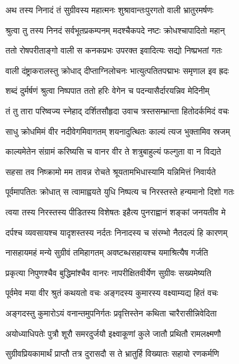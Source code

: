 
\twolineshloka
{अथ तस्य निनादं तं सुग्रीवस्य महात्मनः}
{शुश्रावान्तःपुरगतो वाली भ्रातुरमर्षणः} %

\twolineshloka
{श्रुत्वा तु तस्य निनदं सर्वभूतप्रकम्पनम्}
{मदश्चैकपदे नष्टः क्रोधश्चापादितो महान्} %

\twolineshloka
{ततो रोषपरीताङ्गो वाली स कनकप्रभः}
{उपरक्त इवादित्यः सद्यो निष्प्रभतां गतः} %

\twolineshloka
{वाली दंष्ट्राकरालस्तु क्रोधाद् दीप्ताग्निलोचनः}
{भात्युत्पतितपद्माभः समृणाल इव ह्रदः} %

\twolineshloka
{शब्दं दुर्मर्षणं श्रुत्वा निष्पपात ततो हरिः}
{वेगेन च पदन्यासैर्दारयन्निव मेदिनीम्} %

\twolineshloka
{तं तु तारा परिष्वज्य स्नेहाद् दर्शितसौहृदा}
{उवाच त्रस्तसम्भ्रान्ता हितोदर्कमिदं वचः} %

\twolineshloka
{साधु क्रोधमिमं वीर नदीवेगमिवागतम्}
{शयनादुत्थितः काल्यं त्यज भुक्तामिव स्रजम्} %

\twolineshloka
{काल्यमेतेन संग्रामं करिष्यसि च वानर}
{वीर ते शत्रुबाहुल्यं फल्गुता वा न विद्यते} %

\twolineshloka
{सहसा तव निष्क्रामो मम तावन्न रोचते}
{श्रूयतामभिधास्यामि यन्निमित्तं निवार्यते} %

\twolineshloka
{पूर्वमापतितः क्रोधात् स त्वामाह्वयते युधि}
{निष्पत्य च निरस्तस्ते हन्यमानो दिशो गतः} %

\twolineshloka
{त्वया तस्य निरस्तस्य पीडितस्य विशेषतः}
{इहैत्य पुनराह्वानं शङ्कां जनयतीव मे} %

\twolineshloka
{दर्पश्च व्यवसायश्च यादृशस्तस्य नर्दतः}
{निनादस्य च संरम्भो नैतदल्पं हि कारणम्} %

\twolineshloka
{नासहायमहं मन्ये सुग्रीवं तमिहागतम्}
{अवष्टब्धसहायश्च यमाश्रित्यैष गर्जति} %

\twolineshloka
{प्रकृत्या निपुणश्चैव बुद्धिमांश्चैव वानरः}
{नापरीक्षितवीर्येण सुग्रीवः सख्यमेष्यति} %

\twolineshloka
{पूर्वमेव मया वीर श्रुतं कथयतो वचः}
{अङ्गदस्य कुमारस्य वक्ष्याम्यद्य हितं वचः} %

\twolineshloka
{अङ्गदस्तु कुमारोऽयं वनान्तमुपनिर्गतः}
{प्रवृत्तिस्तेन कथिता चारैरासीन्निवेदिता} %

\twolineshloka
{अयोध्याधिपतेः पुत्रौ शूरौ समरदुर्जयौ}
{इक्ष्वाकूणां कुले जातौ प्रथितौ रामलक्ष्मणौ} %

\twolineshloka
{सुग्रीवप्रियकामार्थं प्राप्तौ तत्र दुरासदौ}
{स ते भ्रातुर्हि विख्यातः सहायो रणकर्मणि} %


